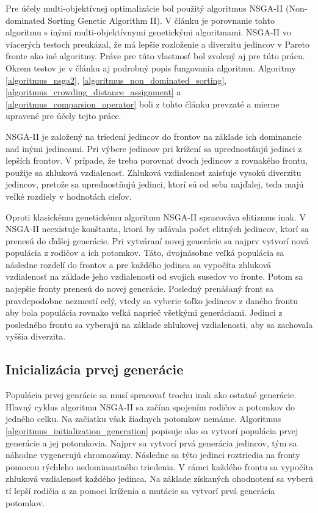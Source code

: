 Pre účely multi-objektívnej optimalizácie bol použitý algoritmus NSGA-II (Non-dominated Sorting Genetic Algorithm II).
V článku \cite{996017} je porovnanie tohto algoritmu s inými multi-objektívnymi genetickými algoritmami.
NSGA-II vo viacerých testoch preukázal, že má lepšie rozloženie a diverzitu jedincov v Pareto fronte ako iné algoritmy.
Práve pre túto vlastnosť bol zvolený aj pre túto prácu.
Okrem testov je v článku \cite{996017} aj podrobný popis fungovania algoritmu.
Algoritmy \ref{algoritmus_nsga2}, \ref{algoritmus_non_dominated_sorting}, \ref{algoritmus_crowding_distance_assignment} a \ref{algoritmus_comparsion_operator} boli z tohto článku prevzaté a mierne upravené pre účely tejto práce.

NSGA-II je založený na triedení jedincov do frontov na základe ich dominancie nad inými jedincami.
Pri výbere jedincov pri krížení sa uprednostňujú jedinci z lepších frontov.
V prípade, že treba porovnať dvoch jedincov z rovnakého frontu, použije sa zhluková vzdialenosť.
Zhluková vzdialenosť zaisťuje vysokú diverzitu jedincov, pretože sa uprednostňujú jedinci, ktorí sú od seba najďalej, teda majú veľké rozdiely v hodnotách cieľov.

Oproti klasickému genetickému algoritmu NSGA-II spracováva elitizmus inak.
V NSGA-II neexistuje konštanta, ktorá by udávala počet elitných jedincov, ktorí sa prenesú do ďalšej generácie.
Pri vytváraní novej generácie sa najprv vytvorí nová populácia z rodičov a ich potomkov.
Táto, dvojnásobne veľká populácia sa následne rozdelí do frontov a pre každého jedinca sa vypočíta zhluková vzdialenosť na základe jeho vzdialenosti od svojich susedov vo fronte.
Potom sa najepšie fronty prenesú do novej generácie.
Posledný prenášaný front sa pravdepodobne nezmestí celý, vtedy sa vyberie toľko jedincov z daného frontu aby bola populácia rovnako veľká naprieč všetkými generáciami.
Jedinci z posledného frontu sa vyberajú na základe zhlukovej vzdialenosti, aby sa zachovala vyššia diverzita.

\subsection*{Inicializácia prvej generácie}
Populácia prvej genrácie sa musí spracovať trochu inak ako ostatné generácie.
Hlavný cyklus algoritmu NSGA-II sa začína spojením rodičov a potomkov do jedného celku.
Na začiatku však žiadnych potomkov nemáme.
Algoritmus \ref{algoritmus_initialization_generation} popisuje ako sa vytvorí populácia prvej generácie a jej potomkovia.
Najprv sa vytvorí prvá generácia jedincov, tým sa náhodne vygenerujú chromozómy.
Následne sa týto jedinci roztriedia na fronty pomocou rýchleho nedominantného triedenia.
V rámci každého frontu sa vypočíta zhluková vzdialenosť každého jedinca.
Na základe získaných ohodnotení sa vyberú tí lepší rodičia a za pomoci kríženia a mutácie sa vytvorí prvá generácia potomkov.

